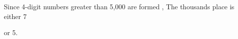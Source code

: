 \documentclass[journal,12pt,onecolumn]{IEEEtran}
\begin{document}


           


            



                
 

 Since 4-digit numbers greater than 5,000 are formed , The thousands place is either 7 
           
 or 5.
\end{document}
